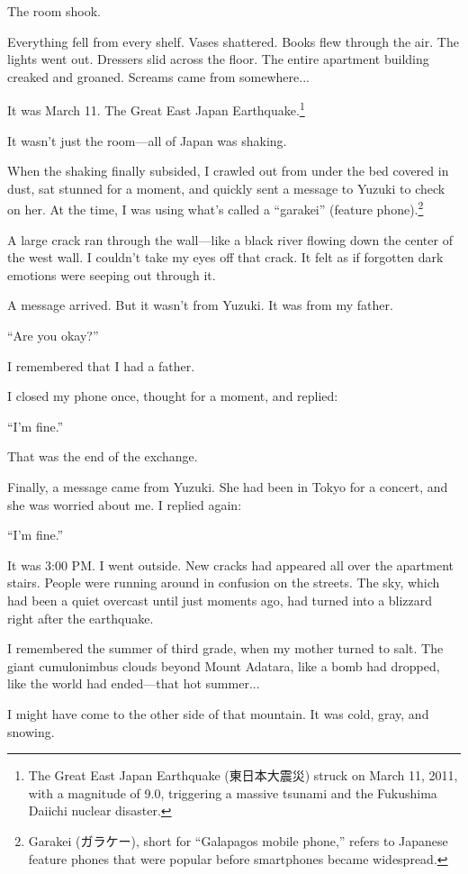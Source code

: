 \documentclass[
    a4paper,
    12pt,
    twoside,
    openany,
    UTF8,
    fontset=windows
]{ctexbook}
\begin{document}
The room shook.

Everything fell from every shelf. Vases shattered. Books flew through the air. The lights went out. Dressers slid across the floor. The entire apartment building creaked and groaned. Screams came from somewhere...

It was March 11. The Great East Japan Earthquake.\footnote{The Great East Japan Earthquake (東日本大震災) struck on March 11, 2011, with a magnitude of 9.0, triggering a massive tsunami and the Fukushima Daiichi nuclear disaster.}

It wasn't just the room---all of Japan was shaking.

When the shaking finally subsided, I crawled out from under the bed covered in dust, sat stunned for a moment, and quickly sent a message to Yuzuki to check on her. At the time, I was using what's called a ``garakei'' (feature phone).\footnote{Garakei (ガラケー), short for ``Galapagos mobile phone,'' refers to Japanese feature phones that were popular before smartphones became widespread.}

A large crack ran through the wall---like a black river flowing down the center of the west wall. I couldn't take my eyes off that crack. It felt as if forgotten dark emotions were seeping out through it.

A message arrived. But it wasn't from Yuzuki. It was from my father.

``Are you okay?''

I remembered that I had a father.

I closed my phone once, thought for a moment, and replied:

``I'm fine.''

That was the end of the exchange.

Finally, a message came from Yuzuki. She had been in Tokyo for a concert, and she was worried about me. I replied again:

``I'm fine.''

It was 3:00 PM. I went outside. New cracks had appeared all over the apartment stairs. People were running around in confusion on the streets. The sky, which had been a quiet overcast until just moments ago, had turned into a blizzard right after the earthquake.

I remembered the summer of third grade, when my mother turned to salt. The giant cumulonimbus clouds beyond Mount Adatara, like a bomb had dropped, like the world had ended---that hot summer...

I might have come to the other side of that mountain. It was cold, gray, and snowing.
\end{document}
